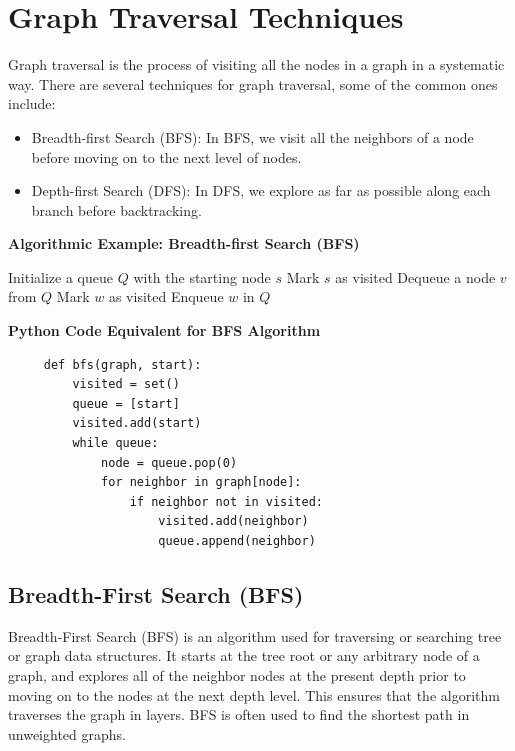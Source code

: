 \documentclass[12pt]{book} %
\begin{document}
\section{Graph Traversal Techniques}
Graph traversal is the process of visiting all the nodes in a graph in a systematic way. There are several techniques for graph traversal, some of the common ones include:
\begin{itemize}
    \item Breadth-first Search (BFS): In BFS, we visit all the neighbors of a node before moving on to the next level of nodes.
    \item Depth-first Search (DFS): In DFS, we explore as far as possible along each branch before backtracking.
\end{itemize}
\FloatBarrier
\textbf{Algorithmic Example: Breadth-first Search (BFS)}
\FloatBarrier
   \begin{algorithm}
     \caption{BFS Algorithm}
     \begin{algorithmic}[1]
       \State Initialize a queue $Q$ with the starting node $s$
       \State Mark $s$ as visited
         \State Dequeue a node $v$ from $Q$
             \State Mark $w$ as visited
             \State Enqueue $w$ in $Q$
           \EndIf
         \EndFor
       \EndWhile
     \end{algorithmic}
   \end{algorithm}
\FloatBarrier
\textbf{Python Code Equivalent for BFS Algorithm}
\FloatBarrier
   \begin{lstlisting}
     def bfs(graph, start):
         visited = set()
         queue = [start]
         visited.add(start)
         while queue:
             node = queue.pop(0)
             for neighbor in graph[node]:
                 if neighbor not in visited:
                     visited.add(neighbor)
                     queue.append(neighbor)
   \end{lstlisting}
   \FloatBarrier

\subsection{Breadth-First Search (BFS)}
Breadth-First Search (BFS) is an algorithm used for traversing or searching tree or graph data structures. It starts at the tree root or any arbitrary node of a graph, and explores all of the neighbor nodes at the present depth prior to moving on to the nodes at the next depth level. This ensures that the algorithm traverses the graph in layers. BFS is often used to find the shortest path in unweighted graphs.
\end{document}
